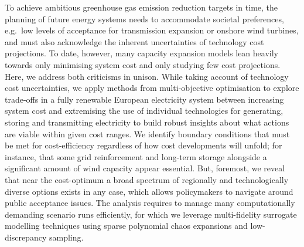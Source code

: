 
To achieve ambitious greenhouse gas emission reduction targets in time, the
planning of future energy systems needs to accommodate societal preferences,
e.g.~low levels of acceptance for transmission expansion or onshore wind
turbines, and must also acknowledge the inherent uncertainties of technology
cost projections. To date, however, many capacity expansion models lean heavily
towards only minimising system cost and only studying few cost projections.
Here, we address both criticisms in unison. While taking account of technology
cost uncertainties, we apply methods from multi-objective optimisation to
explore trade-offs in a fully renewable European electricity system between
increasing system cost and extremising the use of individual technologies for
generating, storing and transmitting electricity to build robust insights about
what actions are viable within given cost ranges. We identify boundary
conditions that must be met for cost-efficiency regardless of how cost
developments will unfold; for instance, that some grid reinforcement and
long-term storage alongside a significant amount of wind capacity appear
essential. But, foremost, we reveal that near the cost-optimum a broad spectrum
of regionally and technologically diverse options exists in any case, which
allows policymakers to navigate around public acceptance issues. The analysis
requires to manage many computationally demanding scenario runs efficiently, for
which we leverage multi-fidelity surrogate modelling techniques using sparse
polynomial chaos expansions and low-discrepancy sampling.
